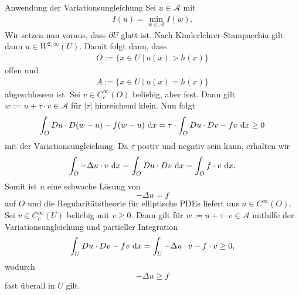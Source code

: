 \begin{genericdf}{Anwendung der Variationsungleichung}\label{skript:2.3}
Sei $u \in \mathcal{A}$ mit 
\begin{align*}
I(u) = \min \limits_{w \in \mathcal{A}} I(w).
\end{align*}
Wir setzen nun voraus, dass $\partial U $ glatt ist.
Nach Kinderlehrer-Stampacchia gilt dann $u \in W^{2,\infty}(U)$.
Damit folgt dann, dass
\begin{align*}
O := \lbrace x \in U \ | \ u(x) > h(x) \rbrace
\end{align*}
offen und
\begin{align*}
A := \lbrace x \in U \ | \ u(x) = h(x) \rbrace
\end{align*}
abgeschlossen ist.
Sei $v \in C_c^\infty(O)$ beliebig, aber fest.
Dann gilt $w := u + \tau \cdot v  \in \mathcal{A}$ für $|\tau|$ hinreichend klein.
Nun folgt
\begin{align*}
\int_O Du \cdot D(w - u ) - f(w-u) \ \text{\rmfamily d} x 
= 
\tau \cdot \int_O Du \cdot Dv - fv  \ \text{\rmfamily d} x
\geq 0 
\end{align*}
mit der Variationsungleichung.
Da $\tau$ postiv und negativ sein kann, erhalten wir  
\begin{align*}
\int_O -\Delta u \cdot v \ \text{\rmfamily d} x = \int_O Du \cdot Dv \ \text{\rmfamily d} x  = \int_O f \cdot v \ \text{\rmfamily d} x.
\end{align*}
Somit ist $u$ eine schwache Lösung von
\begin{equation}\label{equ:2.4}
- \Delta u = f
\end{equation}
auf $O$ und die Regularitätstheorie für elliptische PDEs liefert uns $u \in C^\infty(O)$.
Sei $v \in C_c^\infty(U)$ beliebig mit $v \geq 0 $.
Dann gilt für $w := u + \tau \cdot v  \in \mathcal{A}$ mithilfe der Variationsungleichung und partieller Integration
\begin{align*}
\int_U Du \cdot Dv - fv  \ \text{\rmfamily d} x = \int_U -\Delta u \cdot v - f \cdot v  \geq 0,
\end{align*}
wodurch 
\begin{equation}\label{equ:2.5}
-\Delta u \geq f 
\end{equation}
fast überall in $U$ gilt.
\end{genericdf}
